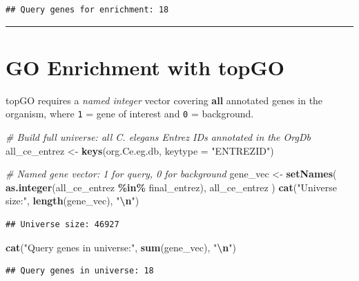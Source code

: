 \documentclass[
  11pt,
]{article}
\newenvironment{Shaded}{\begin{snugshade}}{\end{snugshade}}
\newcommand{\AttributeTok}[1]{\textcolor[rgb]{0.13,0.29,0.53}{#1}}
\newcommand{\CommentTok}[1]{\textcolor[rgb]{0.56,0.35,0.01}{\textit{#1}}}
\newcommand{\FunctionTok}[1]{\textcolor[rgb]{0.13,0.29,0.53}{\textbf{#1}}}
\newcommand{\NormalTok}[1]{#1}
\newcommand{\OtherTok}[1]{\textcolor[rgb]{0.56,0.35,0.01}{#1}}
\newcommand{\SpecialCharTok}[1]{\textcolor[rgb]{0.81,0.36,0.00}{\textbf{#1}}}
\newcommand{\StringTok}[1]{\textcolor[rgb]{0.31,0.60,0.02}{#1}}
\begin{document}
\begin{verbatim}
## Query genes for enrichment: 18
\end{verbatim}

\begin{center}\rule{0.5\linewidth}{0.5pt}\end{center}

\section{GO Enrichment with topGO}\label{go-enrichment-with-topgo}

topGO requires a \emph{named integer} vector covering \textbf{all}
annotated genes in the organism, where \texttt{1} = gene of interest and
\texttt{0} = background.

\begin{Shaded}
\begin{Highlighting}[]
\CommentTok{\# Build full universe: all C. elegans Entrez IDs annotated in the OrgDb}
\NormalTok{all\_ce\_entrez }\OtherTok{\textless{}{-}} \FunctionTok{keys}\NormalTok{(org.Ce.eg.db, }\AttributeTok{keytype =} \StringTok{"ENTREZID"}\NormalTok{)}

\CommentTok{\# Named gene vector: 1 for query, 0 for background}
\NormalTok{gene\_vec }\OtherTok{\textless{}{-}} \FunctionTok{setNames}\NormalTok{(}
  \FunctionTok{as.integer}\NormalTok{(all\_ce\_entrez }\SpecialCharTok{\%in\%}\NormalTok{ final\_entrez),}
\NormalTok{  all\_ce\_entrez}
\NormalTok{)}
\FunctionTok{cat}\NormalTok{(}\StringTok{"Universe size:"}\NormalTok{, }\FunctionTok{length}\NormalTok{(gene\_vec), }\StringTok{"}\SpecialCharTok{\textbackslash{}n}\StringTok{"}\NormalTok{)}
\end{Highlighting}
\end{Shaded}

\begin{verbatim}
## Universe size: 46927
\end{verbatim}

\begin{Shaded}
\begin{Highlighting}[]
\FunctionTok{cat}\NormalTok{(}\StringTok{"Query genes in universe:"}\NormalTok{, }\FunctionTok{sum}\NormalTok{(gene\_vec), }\StringTok{"}\SpecialCharTok{\textbackslash{}n}\StringTok{"}\NormalTok{)}
\end{Highlighting}
\end{Shaded}

\begin{verbatim}
## Query genes in universe: 18
\end{verbatim}
\end{document}
